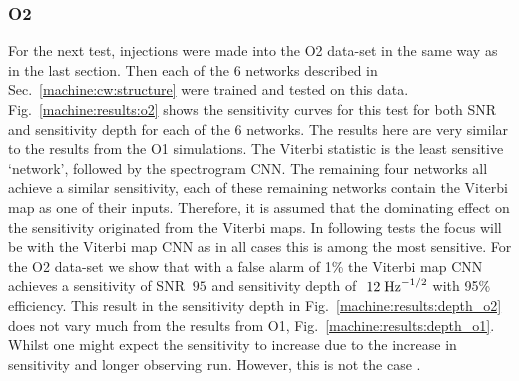 \subsubsection{O2}

For the next test, injections were made into the O2 data-set in the same way as in the last section. Then each of the 6 networks described in Sec.~\ref{machine:cw:structure} were trained and tested on this data. 
Fig.~\ref{machine:results:o2} shows the sensitivity curves for this test for both \gls{SNR} and sensitivity depth for each of the 6 networks.
The results here are very similar to the results from the O1 simulations.
The Viterbi statistic is the least sensitive `network', followed by the spectrogram \gls{CNN}.
The remaining four networks all achieve a similar sensitivity, each of these remaining networks contain the Viterbi map as one of their inputs. Therefore, it is assumed that the dominating effect on the sensitivity originated from the Viterbi maps. In following tests the focus will be with the Viterbi map \gls{CNN} as in all cases this is among the most sensitive.
For the O2 data-set we show that with a false alarm of 1\% the Viterbi map \gls{CNN} achieves a sensitivity of SNR $~95$ and sensitivity depth of $~12\; {\rm Hz}^{-1/2}$ with 95\% efficiency.
This result in the sensitivity depth in Fig.~\ref{machine:results:depth_o2} does not vary much from the results from O1, Fig.~\ref{machine:results:depth_o1}. 
Whilst one might expect the sensitivity to increase due to the increase in sensitivity and longer observing run.
However, this is not the case .


